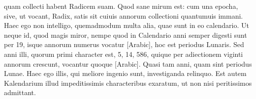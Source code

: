 quam collecti habent Radicem suam.
Quod sane mirum est: cum
una epocha, sive, ut vocant, Radix, satis sit cuiuis annorum collectioni
quantumuis immani.
Haec ego non intelligo, quemadmodum
multa alia, quae sunt in eo calendario.
Ut neque id, quod magis miror,
nempe quod in Calendario anni semper digesti sunt per 19, isque
annorum numerus vocatur \textarabic{[Arabic]}, hoc est periodus Lunaris.
Sed anni
illi, quorum primi character est, 5, 14, 586, quique per adiectionem
viginti annorum crescunt, vocantur quoque \textarabic{[Arabic]}.
Quasi tam 
anni, quam  sint periodus Lunae.
Haec ego illis, qui meliore ingenio
sunt, investiganda relinquo.
Est autem Kalendarium illud impeditissimis
characteribus exaratum, ut non nisi peritissimos admittant.
%
%
